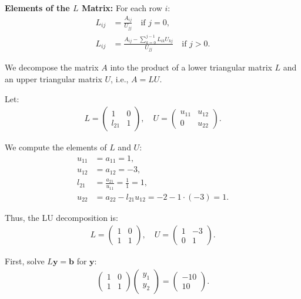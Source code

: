 \documentclass[journal,12pt,onecolumn]{IEEEtran}
\theoremstyle{remark}
\begin{document}
\textbf{Elements of the $L$ Matrix:}  
For each row $i$:  
\begin{align}
    L_{ij} &= \frac{A_{ij}}{U_{jj}} \quad \text{if } j = 0, \\  
    L_{ij} &= \frac{A_{ij} - \sum_{k=0}^{j-1} L_{ik} U_{kj}}{U_{jj}} \quad \text{if } j > 0.  
\end{align}

We decompose the matrix $A$ into the product of a lower triangular matrix $L$ and an upper triangular matrix $U$, i.e., $A = LU$.

Let:
\begin{align}
    L =
    \begin{pmatrix}
        1 & 0 \\
        l_{21} & 1
    \end{pmatrix},
    \quad
    U =
    \begin{pmatrix}
        u_{11} & u_{12} \\
        0 & u_{22}
    \end{pmatrix}.
\end{align}

We compute the elements of $L$ and $U$:
\begin{align}
    u_{11} &= a_{11} = 1, \\
    u_{12} &= a_{12} = -3, \\
    l_{21} &= \frac{a_{21}}{u_{11}} = \frac{1}{1} = 1, \\
    u_{22} &= a_{22} - l_{21} u_{12} = -2 - 1 \cdot (-3) = 1.
\end{align}

Thus, the LU decomposition is:
\begin{align}
    L =
    \begin{pmatrix}
        1 & 0 \\
        1 & 1
    \end{pmatrix},
    \quad
    U =
    \begin{pmatrix}
        1 & -3 \\
        0 & 1
    \end{pmatrix}.
\end{align}


First, solve $L \mathbf{y} = \mathbf{b}$ for $\mathbf{y}$:
\begin{align}
    \begin{pmatrix}
        1 & 0 \\
        1 & 1
    \end{pmatrix}
    \begin{pmatrix}
        y_1 \\ y_2
    \end{pmatrix}
    =
    \begin{pmatrix}
        -10 \\ 10
    \end{pmatrix}.
\end{align}
\end{document}
